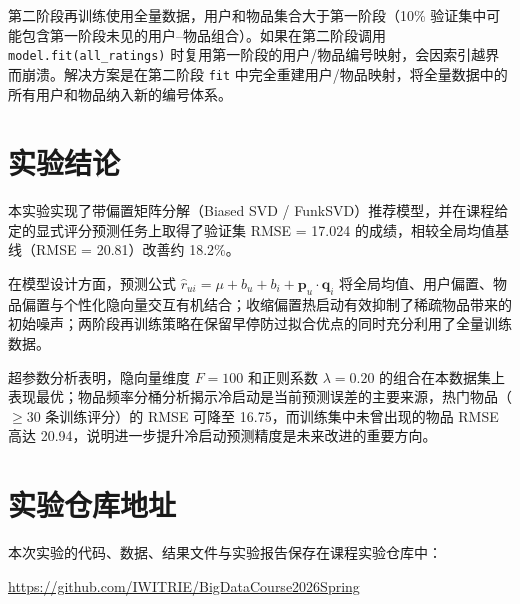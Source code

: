 \documentclass[UTF8,a4paper,10pt]{ctexart}
\newcommand{\xiaosi}{\fontsize{12pt}{20pt}\selectfont}
\begin{document}
第二阶段再训练使用全量数据，用户和物品集合大于第一阶段（10\% 验证集中可能包含第一阶段未见的用户--物品组合）。如果在第二阶段调用 \texttt{model.fit(all\_ratings)} 时复用第一阶段的用户/物品编号映射，会因索引越界而崩溃。解决方案是在第二阶段 \texttt{fit} 中完全重建用户/物品映射，将全量数据中的所有用户和物品纳入新的编号体系。

\section{实验结论}
\xiaosi

本实验实现了带偏置矩阵分解（Biased SVD / FunkSVD）推荐模型，并在课程给定的显式评分预测任务上取得了验证集 RMSE = 17.024 的成绩，相较全局均值基线（RMSE = 20.81）改善约 18.2\%。

在模型设计方面，预测公式 $\hat{r}_{ui} = \mu + b_u + b_i + \mathbf{p}_u\cdot\mathbf{q}_i$ 将全局均值、用户偏置、物品偏置与个性化隐向量交互有机结合；收缩偏置热启动有效抑制了稀疏物品带来的初始噪声；两阶段再训练策略在保留早停防过拟合优点的同时充分利用了全量训练数据。

超参数分析表明，隐向量维度 $F=100$ 和正则系数 $\lambda=0.20$ 的组合在本数据集上表现最优；物品频率分桶分析揭示冷启动是当前预测误差的主要来源，热门物品（$\geq 30$ 条训练评分）的 RMSE 可降至 16.75，而训练集中未曾出现的物品 RMSE 高达 20.94，说明进一步提升冷启动预测精度是未来改进的重要方向。

\section{实验仓库地址}
\xiaosi

本次实验的代码、数据、结果文件与实验报告保存在课程实验仓库中：

\url{https://github.com/IWITRIE/BigDataCourse2026Spring}
\end{document}

